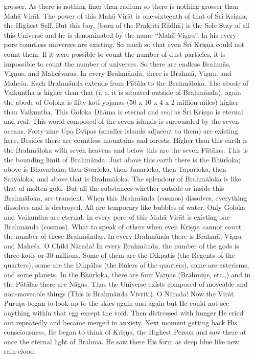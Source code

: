 grosser. As there is nothing finer than radium so there is nothing grosser than Mah\=a Vir\=at. The power of this Mah\=a Vir\=at is one-sixteenth of that of \'Sri Kri\d{s}\d{n}a, the Highest Self. But this boy, (born of the Prakriti R\=adh\=a) is the Sole Stay of all this Universe and he is denominated by the name ``Mah\=a-Vi\d{s}\d{n}u''. In his every pore countless universes are existing. So much so that even \'Sri Kri\d{s}\d{n}a could not count them. If it were possible to count the number of dust particles, it is impossible to count the number of universes. So there are endless Brahm\=as, Vi\d{s}\d{n}us, and Mahe\'svaras. In every Brahm\=anda, there is Brahm\=a, Vi\d{s}\d{n}u, and Mahe\'sa. Each Brahm\=anda extends from P\=at\=ala to the Brahm\=aloka. The abode of Vaikuntha is higher than that (i. e. it is situated outside of Brahm\=anda), again the abode of Goloka is fifty koti yojanas (50 x 10 x 4 x 2 million miles) higher than Vaikuntha. This Goloka Dh\=ama is eternal and real as \'Sri Kri\d{s}\d{n}a is eternal and real. This world composed of the seven islands is surrounded by the seven oceans. Forty-nine Upa Dv\={\i}pas (smaller islands adjacent to them) are existing here. Besides there are countless mountains and forests. Higher than this earth is the Brahm\=aloka with seven heavens and below this are the seven P\=at\=alas. This is the bounding limit of Brahm\=anda. Just above this earth there is the Bh\=urloka; above is Bhuvarloka; then Svarloka, then Janarloka, then Taparloka, then Satyaloka, and above that is Brahm\=aloka. The splendour of Brahm\=aloka is like that of molten gold. But all the substances whether outside or inside this Brahm\=aloka, are transient. When this Brahm\=anda (cosmos) dissolves, everything dissolves and is destroyed. All are temporary like bubbles of water. Only Goloka and Vaikuntha are eternal. In every pore of this Mah\=a Vir\=at is existing one Brahm\=anda (cosmos). What to speak of others when even Kri\d{s}\d{n}a cannot count the number of these Brahm\=andas. In every Brahm\=anda there is Brahm\=a, Vi\d{s}\d{n}u and Mahe\'sa. O Child N\=arada! In every Brahm\=anda, the number of the gods is three kotis or 30 millions. Some of them are the Dikpatis (the Regents of the quarters); some are the Dikp\=alas (the Rulers of the quarters), some are asterisms, and some planets. In the Bh\=urloka, there are four Var\d{n}as (Br\=ahmi\d{n}s, etc.,) and in the P\=at\=alas there are N\=agas. Thus the Universe exists composed of moveable and non-moveable things (This is Brahm\=anda Vivriti). O N\=arada! Now the Vir\=at Puru\d{s}a began to look up to the skies again and again but He could not see anything within that egg except the void. Then distressed with hunger He cried out repeatedly and became merged in anxiety. Next moment getting back His consciousness, He began to think of Kri\d{s}\d{n}a, the Highest Person and saw there at once the eternal light of Brahm\=a. He saw there His form as deep blue like new rain-cloud;

